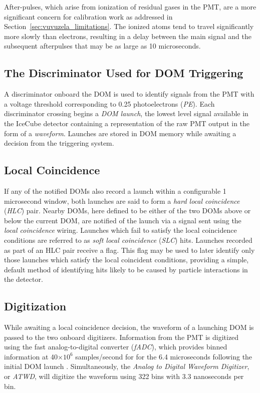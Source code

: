 After-pulses, which arise from ionization of residual gases in the PMT, are a more significant concern for calibration work as addressed in Section~\ref{sec:vuvuzela_limitations}.
The ionized atoms tend to travel significantly more slowly than electrons, resulting in a  delay between the main signal and the subsequent afterpulses that may be as large as 10 microseconds.

\label{ubsec:discriminator}
\subsection{The Discriminator Used for DOM Triggering}
A discriminator onboard the DOM is used to identify signals from the PMT with a voltage threshold corresponding to 0.25 photoelectrons (\emph{PE}).
Each discriminator crossing begins a \emph{DOM launch}, the lowest level signal available in the IceCube detector containing a representation of the raw PMT output in the form of a \emph{waveform}.
Launches are stored in DOM memory while awaiting a decision from the triggering system.

\label{subsec:LC}
\subsection{Local Coincidence}
If any of the notified DOMs also record a launch within a configurable 1 microsecond window, both launches are said to form a \emph{hard local coincidence} (\emph{HLC}) pair.
Nearby DOMs, here defined to be either of the two DOMs above or below the current DOM, are notified of the launch via a signal sent using the \emph{local coincidence} wiring.
Launches which fail to satisfy the local coincidence conditions are referred to as \emph{soft local coincidence} (\emph{SLC}) hits.
Launches recorded as part of an HLC pair receive a flag. 
This flag may be used to later identify only those launches which satisfy the local coincident conditions, providing a simple, default method of identifying hits likely to be caused by particle interactions in the detector.

\label{subsec:digitization}
\subsection{Digitization}
While awaiting a local coincidence decision, the waveform of a launching DOM is passed to the two onboard digitizers.
Information from the PMT is digitized using the fast analog-to-digital converter (\emph{fADC}), which provides binned information at 40$\times 10^6$ samples/second for for the 6.4 microseconds following the initial DOM launch \cite{Description-IceCube}.
Simultaneously, the \emph{Analog to Digital Waveform Digitizer}, or \emph{ATWD}, will digitize the waveform using 322 bins with 3.3 nanoseconds per bin. 

